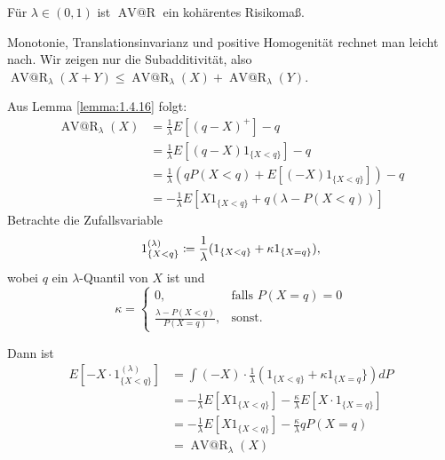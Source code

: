 \documentclass[a4paper,twoside,DIV15,BCOR12mm]{scrbook}
\makeatletter
\DeclareMathOperator{\AVatR}{AV@R}
\makeatother
\begin{document}
\begin{satz}
Für $\lambda\in(0, 1)$ ist $\AVatR$ ein kohärentes Risikomaß.
\end{satz}
\begin{beweis}
Monotonie, Translationsinvarianz und positive Homogenität rechnet man leicht nach. Wir zeigen nur die Subadditivität, also $\AVatR_\lambda(X+Y) \le \AVatR_\lambda(X) + \AVatR_\lambda(Y)$.

Aus Lemma \ref{lemma:1.4.16} folgt: 
\begin{align*}
\AVatR_\lambda(X) &= \frac1\lambda E[(q-X)^+] -q \\
&= \frac1\lambda E[(q-X)1_{\{X<q\}}]-q \\
&= \frac1\lambda (qP(X<q) + E[(-X)1_{\{X<q\}}])-q \\
&= -\frac1\lambda E[X 1_{\{X<q\}} + q(\lambda - P(X<q))]
\end{align*}
Betrachte die Zufallsvariable \[1_{\{X<q\}}^{(\lambda)}\da \frac1\lambda (1_{\{X<q\}} + \kappa 1_{\{X=q\}}),\] wobei $q$ ein $\lambda$-Quantil von $X$ ist und
\[
\kappa = 
\begin{cases}
0, &\text{falls } P(X=q)=0 \\
\frac{\lambda-P(X<q)}{P(X=q)}, & \text{sonst.}
\end{cases}
\]

Dann ist 
\begin{align*}
E[-X\cdot 1_{\{X<q\}}^{(\lambda)}] &= \int (-X) \cdot \frac1\lambda (1_{\{X<q\}} + \kappa 1_{\{X=q}\}) dP \\
&= -\frac1\lambda E[X1_{\{X<q\}}] - \frac\kappa\lambda E[X \cdot 1_{\{X=q\}}] \\
&= -\frac1\lambda E[X1_{\{X<q\}}] - \frac\kappa\lambda qP(X=q) \\
&= \AVatR_\lambda(X)
\end{align*}


\end{beweis}
\end{document}
